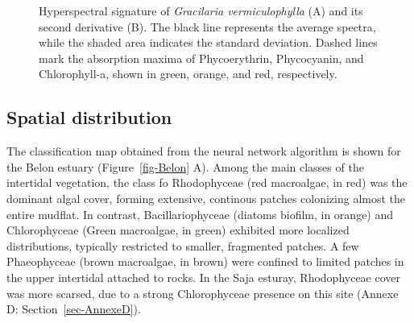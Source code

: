 \documentclass[
  letterpaper,
  DIV=11,
  numbers=noendperiod]{scrartcl}
\begin{document}
\label{cell-fig-SpecDescri}
\begin{figure}[H]


\caption{\label{fig-SpecDescri}Hyperspectral signature of
\emph{Gracilaria vermiculophylla} (A) and its second derivative (B). The
black line represents the average spectra, while the shaded area
indicates the standard deviation. Dashed lines mark the absorption
maxima of Phycoerythrin, Phycocyanin, and Chlorophyll-a, shown in green,
orange, and red, respectively.}

\end{figure}%

\subsection{Spatial distribution}\label{spatial-distribution}

The classification map obtained from the neural network algorithm is
shown for the Belon estuary (Figure~\ref{fig-Belon} A). Among the main
classes of the intertidal vegetation, the class fo Rhodophyceae (red
macroalgae, in red) was the dominant algal cover, forming extensive,
continous patches colonizing almost the entire mudflat. In contrast,
Bacillariophyceae (diatoms biofilm, in orange) and Chlorophyceae (Green
macroalgae, in green) exhibited more localized distributions, typically
restricted to smaller, fragmented patches. A few Phaeophyceae (brown
macroalgae, in brown) were confined to limited patches in the upper
intertidal attached to rocks. In the Saja esturay, Rhodophyceae cover
was more scarsed, due to a strong Chlorophyceae presence on this site
(Annexe D: Section~\ref{sec-AnnexeD}).
\end{document}
